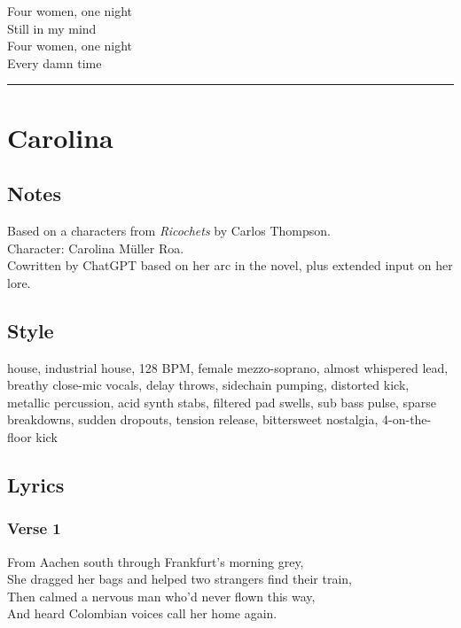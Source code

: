 Four women, one night\\
Still in my mind\\
Four women, one night\\
Every damn time

\begin{center}\rule{0.5\linewidth}{0.5pt}\end{center}

\section{Carolina}\label{carolina}

\subsection{Notes}\label{notes-18}

Based on a characters from \emph{Ricochets} by Carlos Thompson.\\
Character: Carolina Müller Roa.\\
Cowritten by ChatGPT based on her arc in the novel, plus extended input
on her lore.

\subsection{Style}\label{style-18}

house, industrial house, 128 BPM, female mezzo-soprano, almost whispered
lead, breathy close-mic vocals, delay throws, sidechain pumping,
distorted kick, metallic percussion, acid synth stabs, filtered pad
swells, sub bass pulse, sparse breakdowns, sudden dropouts, tension
release, bittersweet nostalgia, 4-on-the-floor kick

\subsection{Lyrics}\label{lyrics-18}

\subsubsection{Verse 1}\label{verse-1-14}

From Aachen south through Frankfurt's morning grey,\\
She dragged her bags and helped two strangers find their train,\\
Then calmed a nervous man who'd never flown this way,\\
And heard Colombian voices call her home again.

